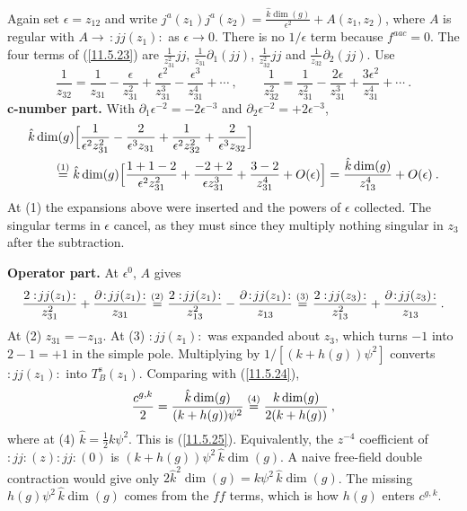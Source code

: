 \begin{tcolorbox}[breakable]
	\begin{remark}
		Again set $\epsilon=z_{12}$ and write $j^{a}(z_{1})j^{a}(z_{2})=\frac{\hat{k}\operatorname{dim}(g)}{\epsilon^{2}}+A(z_{1},z_{2})$, where $A$ is regular with $A\to\,:\!jj(z_{1})\!:$ as $\epsilon\to0$. There is no $1/\epsilon$ term because $f^{aac}=0$. The four terms of (\ref{11.5.23}) are $\frac{1}{z_{31}^{2}}jj$, $\frac{1}{z_{31}}\partial_{1}(jj)$, $\frac{1}{z_{32}^{2}}jj$ and $\frac{1}{z_{32}}\partial_{2}(jj)$. Use
		\begin{equation*}
			\frac{1}{z_{32}}=\frac{1}{z_{31}}-\frac{\epsilon}{z_{31}^{2}}+\frac{\epsilon^{2}}{z_{31}^{3}}-\frac{\epsilon^{3}}{z_{31}^{4}}+\cdots\:,\qquad
			\frac{1}{z_{32}^{2}}=\frac{1}{z_{31}^{2}}-\frac{2\epsilon}{z_{31}^{3}}+\frac{3\epsilon^{2}}{z_{31}^{4}}+\cdots\:.
		\end{equation*}
		\textbf{c-number part.} With $\partial_{1}\epsilon^{-2}=-2\epsilon^{-3}$ and $\partial_{2}\epsilon^{-2}=+2\epsilon^{-3}$,
		\begin{align*}
			&\hat{k}\operatorname{dim}(g)\Bigl[\frac{1}{\epsilon^{2}z_{31}^{2}}-\frac{2}{\epsilon^{3}z_{31}}+\frac{1}{\epsilon^{2}z_{32}^{2}}+\frac{2}{\epsilon^{3}z_{32}}\Bigr]\\
			&\qquad\overset{(1)}{=}\hat{k}\operatorname{dim}(g)\Bigl[\frac{1+1-2}{\epsilon^{2}z_{31}^{2}}+\frac{-2+2}{\epsilon z_{31}^{3}}+\frac{3-2}{z_{31}^{4}}+O(\epsilon)\Bigr]
			=\frac{\hat{k}\operatorname{dim}(g)}{z_{13}^{4}}+O(\epsilon)\:.
		\end{align*}
		At (1) the expansions above were inserted and the powers of $\epsilon$ collected. The singular terms in $\epsilon$ cancel, as they must since they multiply nothing singular in $z_{3}$ after the subtraction.

		\textbf{Operator part.} At $\epsilon^{0}$, $A$ gives
		\begin{equation*}
			\frac{2:\!jj(z_{1})\!:}{z_{31}^{2}}+\frac{\partial\!:\!jj(z_{1})\!:}{z_{31}}
			\eqs{2}\frac{2:\!jj(z_{1})\!:}{z_{13}^{2}}-\frac{\partial\!:\!jj(z_{1})\!:}{z_{13}}
			\eqs{3}\frac{2:\!jj(z_{3})\!:}{z_{13}^{2}}+\frac{\partial\!:\!jj(z_{3})\!:}{z_{13}}\:.
		\end{equation*}
		At (2) $z_{31}=-z_{13}$. At (3) $:\!jj(z_{1})\!:$ was expanded about $z_{3}$, which turns $-1$ into $2-1=+1$ in the simple pole. Multiplying by $1/[(k+h(g))\psi^{2}]$ converts $:\!jj(z_{1})\!:$ into $T^{\mathrm{s}}_{B}(z_{1})$. Comparing with (\ref{11.5.24}),
		\begin{equation*}
			\frac{c^{g,k}}{2}=\frac{\hat{k}\operatorname{dim}(g)}{(k+h(g))\psi^{2}}\overset{(4)}{=}\frac{k\operatorname{dim}(g)}{2(k+h(g))}\:,
		\end{equation*}
		where at (4) $\hat{k}=\frac{1}{2}k\psi^{2}$. This is (\ref{11.5.25}). Equivalently, the $z^{-4}$ coefficient of $:\!jj\!:(z):\!jj\!:(0)$ is $(k+h(g))\psi^{2}\,\hat{k}\operatorname{dim}(g)$. A naive free-field double contraction would give only $2\hat{k}^{2}\operatorname{dim}(g)=k\psi^{2}\,\hat{k}\operatorname{dim}(g)$. The missing $h(g)\psi^{2}\,\hat{k}\operatorname{dim}(g)$ comes from the $ff$ terms, which is how $h(g)$ enters $c^{g,k}$.
	\end{remark}
\end{tcolorbox}

